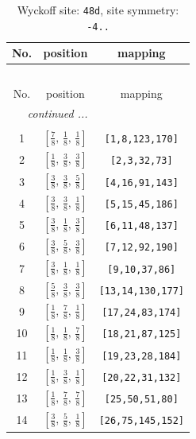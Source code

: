 \documentclass[fleqn,8pt]{jsarticle}
\begin{document}
\begin{longtable}{ccc}
\caption{Wyckoff site: {\tt 48d}, site symmetry: {\tt -4..}}
 \\
 \hline \hline
No. & position & mapping \\ \hline \endfirsthead

\multicolumn{2}{l}{\tablename\ \thetable{}} \\
 \hline \hline
No. & position & mapping \\ \hline \endhead

 \hline \hline
\multicolumn{2}{r}{\footnotesize\it continued ...} \\ \endfoot

 \hline \hline
\multicolumn{2}{r}{} \\ \endlastfoot

1 & $\left[ \frac{7}{8},\, \frac{1}{8},\, \frac{1}{8} \right]$ & {\tt [1,8,123,170]} \\ \hline
2 & $\left[ \frac{1}{8},\, \frac{3}{8},\, \frac{3}{8} \right]$ & {\tt [2,3,32,73]} \\ \hline
3 & $\left[ \frac{3}{8},\, \frac{3}{8},\, \frac{5}{8} \right]$ & {\tt [4,16,91,143]} \\ \hline
4 & $\left[ \frac{3}{8},\, \frac{3}{8},\, \frac{1}{8} \right]$ & {\tt [5,15,45,186]} \\ \hline
5 & $\left[ \frac{3}{8},\, \frac{1}{8},\, \frac{3}{8} \right]$ & {\tt [6,11,48,137]} \\ \hline
6 & $\left[ \frac{3}{8},\, \frac{5}{8},\, \frac{3}{8} \right]$ & {\tt [7,12,92,190]} \\ \hline
7 & $\left[ \frac{3}{8},\, \frac{1}{8},\, \frac{1}{8} \right]$ & {\tt [9,10,37,86]} \\ \hline
8 & $\left[ \frac{5}{8},\, \frac{3}{8},\, \frac{3}{8} \right]$ & {\tt [13,14,130,177]} \\ \hline
9 & $\left[ \frac{1}{8},\, \frac{7}{8},\, \frac{1}{8} \right]$ & {\tt [17,24,83,174]} \\ \hline
10 & $\left[ \frac{1}{8},\, \frac{1}{8},\, \frac{7}{8} \right]$ & {\tt [18,21,87,125]} \\ \hline
11 & $\left[ \frac{1}{8},\, \frac{1}{8},\, \frac{3}{8} \right]$ & {\tt [19,23,28,184]} \\ \hline
12 & $\left[ \frac{1}{8},\, \frac{3}{8},\, \frac{1}{8} \right]$ & {\tt [20,22,31,132]} \\ \hline
13 & $\left[ \frac{1}{8},\, \frac{7}{8},\, \frac{7}{8} \right]$ & {\tt [25,50,51,80]} \\ \hline
14 & $\left[ \frac{3}{8},\, \frac{5}{8},\, \frac{1}{8} \right]$ & {\tt [26,75,145,152]} \\ \hline

\end{longtable}
\end{document}
